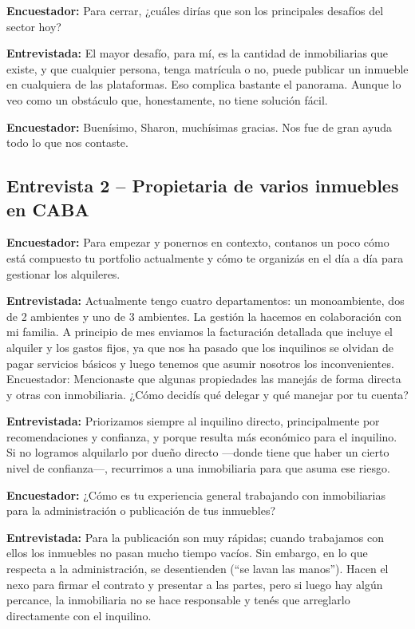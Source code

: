 \textbf{Encuestador:} Para cerrar, ¿cuáles dirías que son los principales desafíos del sector hoy?

\textbf{Entrevistada:} El mayor desafío, para mí, es la cantidad de inmobiliarias que existe, y que cualquier persona, tenga matrícula o no, puede publicar un inmueble en cualquiera de las plataformas. Eso complica bastante el panorama. Aunque lo veo como un obstáculo que, honestamente, no tiene solución fácil.

\textbf{Encuestador:} Buenísimo, Sharon, muchísimas gracias. Nos fue de gran ayuda todo lo que nos contaste.

\subsection{Entrevista 2 -- Propietaria de varios inmuebles en CABA}

\textbf{Encuestador:} Para empezar y ponernos en contexto, contanos un poco cómo está compuesto tu portfolio actualmente y cómo te organizás en el día a día para gestionar los alquileres.

\textbf{Entrevistada:} Actualmente tengo cuatro departamentos: un monoambiente, dos de 2 ambientes y uno de 3 ambientes. La gestión la hacemos en colaboración con mi familia. A principio de mes enviamos la facturación detallada que incluye el alquiler y los gastos fijos, ya que nos ha pasado que los inquilinos se olvidan de pagar servicios básicos y luego tenemos que asumir nosotros los inconvenientes. Encuestador: Mencionaste que algunas propiedades las manejás de forma directa y otras con inmobiliaria. ¿Cómo decidís qué delegar y qué manejar por tu cuenta?

\textbf{Entrevistada:} Priorizamos siempre al inquilino directo, principalmente por recomendaciones y confianza, y porque resulta más económico para el inquilino. Si no logramos alquilarlo por dueño directo ---donde tiene que haber un cierto nivel de confianza---, recurrimos a una inmobiliaria para que asuma ese riesgo.

\textbf{Encuestador:} ¿Cómo es tu experiencia general trabajando con inmobiliarias para la administración o publicación de tus inmuebles?

\textbf{Entrevistada:} Para la publicación son muy rápidas; cuando trabajamos con ellos los inmuebles no pasan mucho tiempo vacíos. Sin embargo, en lo que respecta a la administración, se desentienden (``se lavan las manos''). Hacen el nexo para firmar el contrato y presentar a las partes, pero si luego hay algún percance, la inmobiliaria no se hace responsable y tenés que arreglarlo directamente con el inquilino.

